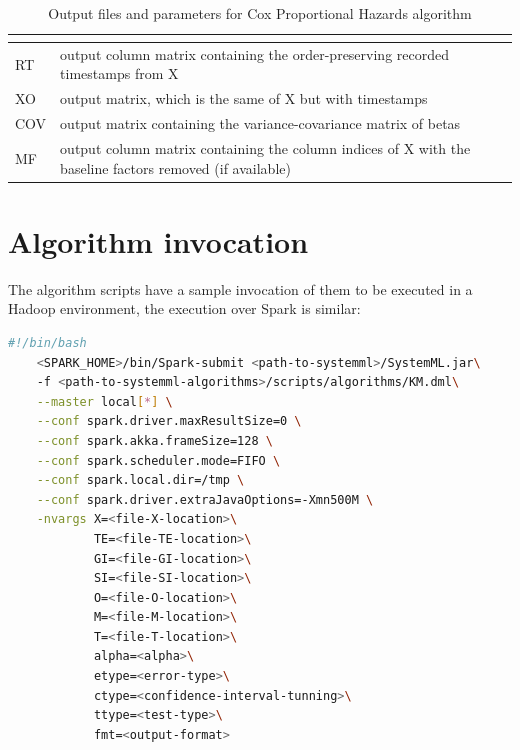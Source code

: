 \documentclass[11pt]{book} %
\begin{document}
\begin{table}[!h]
\begin{tabular}{|>{\centering\arraybackslash}m{}|m{}|}
\begin{itemize}
            \end{itemize}
            \\ \hline
            RT & output column matrix containing the order-preserving recorded timestamps from X \\ \hline
            XO & output matrix, which is the same of X but with timestamps \\ \hline
            COV & output matrix containing the variance-covariance matrix of betas \\ \hline
            MF & output column matrix containing the column indices of X with the baseline factors removed (if available) \\ \hline
        \end{tabular}
        \caption{Output files and parameters for Cox Proportional Hazards algorithm}
        \label{tab:Cox_IO_files}
      \end{table}

\newpage

  \section{Algorithm invocation}

    The algorithm scripts have a sample invocation of them to be executed in a Hadoop environment, the execution over Spark is similar:

    \begin{lstlisting}[label=code:km-invocation-Spark, language=sh, caption=Example of the invocation of the Kaplan-Meier Estimates model with Apache SystemML over an Apache Spark framework]
    #!/bin/bash
    <SPARK_HOME>/bin/Spark-submit <path-to-systemml>/SystemML.jar\
    -f <path-to-systemml-algorithms>/scripts/algorithms/KM.dml\
    --master local[*] \
    --conf spark.driver.maxResultSize=0 \
    --conf spark.akka.frameSize=128 \
    --conf spark.scheduler.mode=FIFO \
    --conf spark.local.dir=/tmp \
    --conf spark.driver.extraJavaOptions=-Xmn500M \
    -nvargs X=<file-X-location>\
            TE=<file-TE-location>\
            GI=<file-GI-location>\
            SI=<file-SI-location>\
            O=<file-O-location>\
            M=<file-M-location>\
            T=<file-T-location>\
            alpha=<alpha>\
            etype=<error-type>\
            ctype=<confidence-interval-tunning>\
            ttype=<test-type>\
            fmt=<output-format>
    \end{lstlisting}
\end{document}
